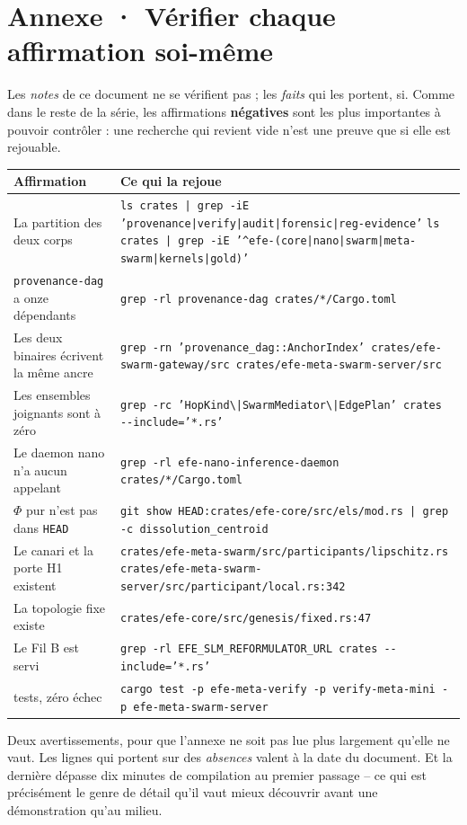 \documentclass[10pt]{article}
\newcommand{\code}[1]{\texttt{\small #1}}
\begin{document}
\section{Annexe · Vérifier chaque affirmation soi-même}

Les \emph{notes} de ce document ne se vérifient pas ; les \emph{faits} qui les portent, si. Comme dans
le reste de la série, les affirmations \textbf{négatives} sont les plus importantes à pouvoir contrôler :
une recherche qui revient vide n'est une preuve que si elle est rejouable.

\renewcommand{\arraystretch}{1.22}
\begin{center}\small
\begin{tabular}{@{}>{\raggedright\arraybackslash}p{5.3cm} >{\raggedright\arraybackslash}p{10.8cm}@{}}
\toprule
\textbf{Affirmation} & \textbf{Ce qui la rejoue} \\
\midrule
La partition des deux corps &
  \code{ls crates | grep -iE 'provenance|verify|audit|forensic|reg-evidence'} \newline
  \code{ls crates | grep -iE '\textasciicircum efe-(core|nano|swarm|meta-swarm|kernels|gold)'} \\
\code{provenance-dag} a onze dépendants &
  \code{grep -rl provenance-dag crates/*/Cargo.toml} \\
Les deux binaires écrivent la même ancre &
  \code{grep -rn 'provenance\_dag::AnchorIndex' crates/efe-swarm-gateway/src crates/efe-meta-swarm-server/src} \\
Les ensembles joignants sont à zéro &
  \code{grep -rc 'HopKind\textbackslash|SwarmMediator\textbackslash|EdgePlan' crates -{}-include='*.rs'} \\
Le daemon nano n'a aucun appelant &
  \code{grep -rl efe-nano-inference-daemon crates/*/Cargo.toml} \\
$\Phi$ pur n'est pas dans \code{HEAD} &
  \code{git show HEAD:crates/efe-core/src/els/mod.rs | grep -c dissolution\_centroid} \\
Le canari et la porte H1 existent &
  \code{crates/efe-meta-swarm/src/participants/lipschitz.rs} \newline
  \code{crates/efe-meta-swarm-server/src/participant/local.rs:342} \\
La topologie fixe existe &
  \code{crates/efe-core/src/genesis/fixed.rs:47} \\
Le Fil B est servi &
  \code{grep -rl EFE\_SLM\_REFORMULATOR\_URL crates -{}-include='*.rs'} \\
515 tests, zéro échec &
  \code{cargo test -p efe-meta-verify -p verify-meta-mini -p efe-meta-swarm-server} \\
\bottomrule
\end{tabular}
\end{center}

Deux avertissements, pour que l'annexe ne soit pas lue plus largement qu'elle ne vaut. Les lignes qui
portent sur des \emph{absences} valent à la date du document. Et la dernière dépasse dix minutes de
compilation au premier passage -- ce qui est précisément le genre de détail qu'il vaut mieux découvrir
avant une démonstration qu'au milieu.
\end{document}
